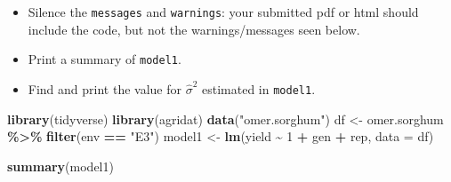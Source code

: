 \documentclass[
]{article}
\newenvironment{Shaded}{\begin{snugshade}}{\end{snugshade}}
\newcommand{\AttributeTok}[1]{\textcolor[rgb]{0.13,0.29,0.53}{#1}}
\newcommand{\DecValTok}[1]{\textcolor[rgb]{0.00,0.00,0.81}{#1}}
\newcommand{\FunctionTok}[1]{\textcolor[rgb]{0.13,0.29,0.53}{\textbf{#1}}}
\newcommand{\NormalTok}[1]{#1}
\newcommand{\OtherTok}[1]{\textcolor[rgb]{0.56,0.35,0.01}{#1}}
\newcommand{\SpecialCharTok}[1]{\textcolor[rgb]{0.81,0.36,0.00}{\textbf{#1}}}
\newcommand{\StringTok}[1]{\textcolor[rgb]{0.31,0.60,0.02}{#1}}
\providecommand{\tightlist}{%
  \setlength{\itemsep}{0pt}\setlength{\parskip}{0pt}}
\begin{document}
\begin{itemize}
\tightlist
\item
  Silence the \texttt{messages} and \texttt{warnings}: your submitted
  pdf or html should include the code, but not the warnings/messages
  seen below.
\item
  Print a summary of \texttt{model1}.
\item
  Find and print the value for \(\hat\sigma^2\) estimated in
  \texttt{model1}.
\end{itemize}

\begin{Shaded}
\begin{Highlighting}[]
\FunctionTok{library}\NormalTok{(tidyverse)}
\FunctionTok{library}\NormalTok{(agridat)}
\FunctionTok{data}\NormalTok{(}\StringTok{"omer.sorghum"}\NormalTok{)}
\NormalTok{df }\OtherTok{\textless{}{-}}\NormalTok{ omer.sorghum }\SpecialCharTok{\%\textgreater{}\%} \FunctionTok{filter}\NormalTok{(env }\SpecialCharTok{==} \StringTok{"E3"}\NormalTok{)}
\NormalTok{model1 }\OtherTok{\textless{}{-}} \FunctionTok{lm}\NormalTok{(yield }\SpecialCharTok{\textasciitilde{}} \DecValTok{1} \SpecialCharTok{+}\NormalTok{ gen }\SpecialCharTok{+}\NormalTok{ rep, }\AttributeTok{data =}\NormalTok{ df)}
\end{Highlighting}
\end{Shaded}

\begin{Shaded}
\begin{Highlighting}[]
\FunctionTok{summary}\NormalTok{(model1)}
\end{Highlighting}
\end{Shaded}
\end{document}
